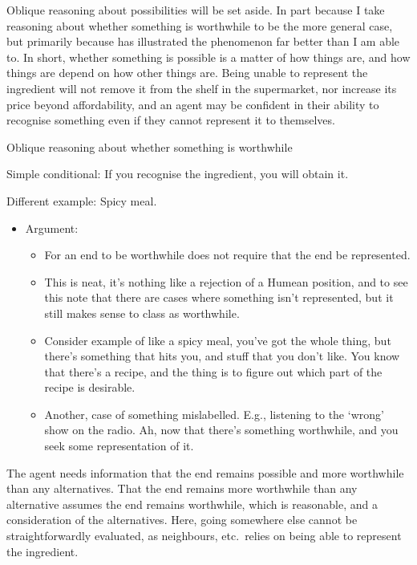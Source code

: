 \documentclass[10pt]{article}
\begin{document}
Oblique reasoning about possibilities will be set aside.
In part because I take reasoning about whether something is worthwhile to be the more general case, but primarily because \textcite{Perry:1997aa} has illustrated the phenomenon far better than I am able to.
In short, whether something is possible is a matter of how things are, and how things are depend on how other things are.
Being unable to represent the ingredient will not remove it from the shelf in the supermarket, nor increase its price beyond affordability, and an agent may be confident in their ability to recognise something even if they cannot represent it to themselves.

Oblique reasoning about whether something is worthwhile




Simple conditional: If you recognise the ingredient, you will obtain it.

Different example: Spicy meal.


\begin{itemize}
\item Argument:
  \begin{itemize}
  \item For an end to be worthwhile does not require that the end be represented.
  \item This is neat, it's nothing like a rejection of a Humean position, and to see this note that there are cases where something isn't represented, but it still makes sense to class as worthwhile.
  \item Consider example of like a spicy meal, you've got the whole thing, but there's something that hits you, and stuff that you don't like.
    You know that there's a recipe, and the thing is to figure out which part of the recipe is desirable.
  \item Another, case of something mislabelled.
    E.g., listening to the `wrong' show on the radio.
    Ah, now that there's something worthwhile, and you seek some representation of it.
  \end{itemize}
\end{itemize}






The agent needs information that the end remains possible and more worthwhile than any alternatives.
That the end remains more worthwhile than any alternative assumes the end remains worthwhile, which is reasonable, and a consideration of the alternatives.
Here, going somewhere else cannot be straightforwardly evaluated, as neighbours, etc.\ relies on being able to represent the ingredient.
\end{document}
